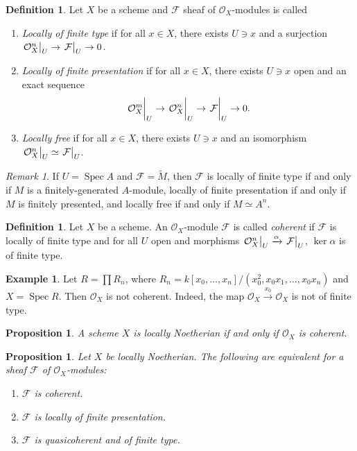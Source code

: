 \documentclass[leqno, openany]{memoir}
\newtheorem{prop}[thm]{Proposition}
\theoremstyle{definition}
\newtheorem{defn}[thm]{Definition}
\newtheorem{exm}[thm]{Example}
\theoremstyle{remark}
\newtheorem{rmk}[thm]{Remark}
\theoremstyle{plain}
\theoremstyle{definition}
\theoremstyle{remark}
\newcommand{\mc}[1]{\mathcal{#1}}
\newcommand{\wt}[1]{\widetilde{#1}}
\DeclareMathOperator{\Spec}{Spec}
\begin{document}
\begin{defn} Let $X$ be a scheme and $\mc{F}$  sheaf of $\mc{O}_X$-modules is
    called \begin{enumerate} \item \textit{Locally of finite type} if for all
        $x \in X$, there exists $U \ni x$ and a surjection $\eval{\mc{O}^n_X}_U
        \to \eval{\mc{F}}_U \to 0$.  \item \textit{Locally of finite
        presentation} if for all $x \in X$, there exists $U \ni x$ open and an
        exact sequence \[ \eval{\mc{O}^m_X}_U \to \eval{\mc{O}_X^n}_U \to
        \eval{\mc{F}}_U \to 0. \] \item \textit{Locally free} if for all $x \in
        X$, there exists $U \ni x$ and an isomorphism $\eval{\mc{O}_X^n}_U
        \simeq \eval{\mc{F}}_U$.  \end{enumerate} \end{defn}

\begin{rmk} If $U = \Spec A$ and $\mc{F} = \wt{M}$, then $\mc{F}$ is locally of
    finite type if and only if $M$ is a finitely-generated $A$-module, locally
    of finite presentation if and only if $M$ is finitely presented, and
    locally free if and only if $M \simeq A^n$.  \end{rmk}

\begin{defn} Let $X$ be a scheme. An $\mc{O}_X$-module $\mc{F}$ is called
    \textit{coherent} if $\mc{F}$ is locally of finite type and for all $U$
    open and morphisms $\eval{\mc{O}_X^n}_U \xrightarrow{\alpha}
    \eval{\mc{F}}_U$, $\ker \alpha$ is of finite type.  \end{defn}

\begin{exm} Let $R = \prod R_n$, where $R_n = k[x_0, \ldots, x_n] / (x_0^2, x_0
x_1, \ldots, x_0 x_n)$ and $X = \Spec R$. Then $\mc{O}_X$ is not coherent.
Indeed, the map $\mc{O}_X \xrightarrow{x_0} \mc{O}_X$ is not of finite type.
\end{exm}

\begin{prop} A scheme $X$ is locally Noetherian if and only if $\mc{O}_X$ is
coherent.  \end{prop}

\begin{prop} Let $X$ be locally Noetherian. The following are equivalent for a
    sheaf $\mc{F}$ of $\mc{O}_X$-modules: \begin{enumerate} \item $\mc{F}$ is
        coherent.  \item $\mc{F}$ is locally of finite presentation.  \item
        $\mc{F}$ is quasicoherent and of finite type.  \end{enumerate}
    \end{prop}
\end{document}
